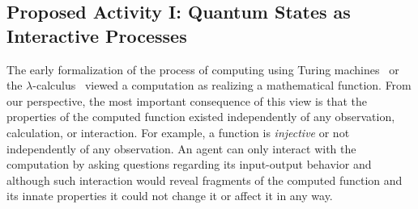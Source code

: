 \documentclass{article}
\theoremstyle{remark}
\begin{document}
\begin{itemize}
\end{itemize} 

\subsection{Proposed Activity I: Quantum States as Interactive Processes} 

The early formalization of the process of computing using Turing
machines~\cite{Turing01011937} or the
$\lambda$-calculus~\cite{Barendregt:Lambda} viewed a computation as
realizing a mathematical function. From our perspective, the most
important consequence of this view is that the properties of the
computed function existed independently of any observation,
calculation, or interaction. For example, a function is
\emph{injective} or not independently of any observation. An agent can
only interact with the computation by asking questions regarding its
input-output behavior and although such interaction would reveal
fragments of the computed function and its innate properties it could
not change it or affect it in any way.
\end{document}

